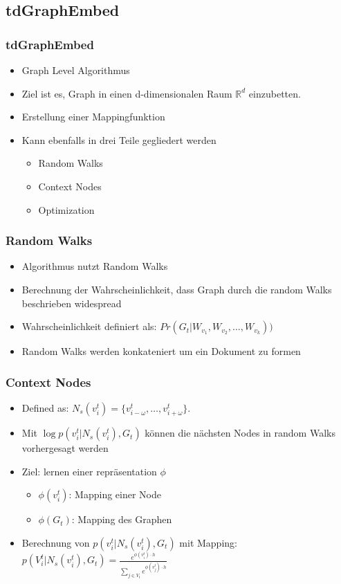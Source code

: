 \documentclass{beamer}
\begin{document}
\subsection{tdGraphEmbed}
\begin{frame}
  \frametitle{tdGraphEmbed}
  \begin{itemize}
    \item Graph Level Algorithmus
    \item Ziel ist es, Graph in einen d-dimensionalen Raum \(\mathbb{R}^d\) einzubetten.
    \item Erstellung einer Mappingfunktion
    \item Kann ebenfalls in drei Teile gegliedert werden
    \begin{itemize}
      \item Random Walks
      \item Context Nodes
      \item Optimization
    \end{itemize}
  \end{itemize}
\end{frame}

\begin{frame}
  \frametitle{Random Walks}
  \begin{itemize}
    \item Algorithmus nutzt Random Walks
    \item Berechnung der Wahrscheinlichkeit, dass Graph durch die random Walks beschrieben widespread
    \item Wahrscheinlichkeit definiert als:   \(Pr(G_t|W_{v_1}, W_{v_2},\ldots, W_{v_k}))\)
    \item Random Walks werden konkateniert um ein Dokument zu formen
  \end{itemize}
\end{frame}

\begin{frame}
  \frametitle{Context Nodes}
  \begin{itemize}
    \item Defined as:   \(N_s(v_i^t)=\{v_{i-\omega}^t, \ldots, v_{i+\omega}^t\}\).
    \item Mit \(\log{p(v_i^t | N_s(v_i^t), G_t)}\) können die nächsten Nodes in random Walks vorhergesagt werden
    \item Ziel: lernen einer repräsentation \(\phi\)
    \begin{itemize}
      \item \(\phi(v_i^t)\): Mapping einer Node 
      \item \(\phi(G_t)\): Mapping des Graphen
    \end{itemize}
    \item Berechnung von \(p(v_i^t | N_s(v_i^t), G_t)\) mit Mapping: 
    \(p(V_i^t|N_s(v_i^t), G_t) = \frac{e^{\phi(v_i^t) \cdot h}}{\sum\limits_{j \in V_t} e^{\phi(v_j^t) \cdot h}} \)

  \end{itemize}
\end{frame}
\end{document}
